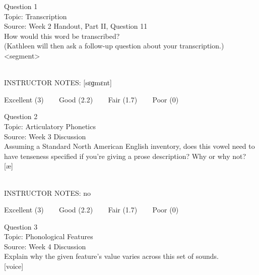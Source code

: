 \documentclass[12pt]{article}
\begin{document}
\begin{center}
\textbf{{\color{blue}{\HUGE START OF EXAM\\}}}

\textbf{{\color{blue}{\HUGE Student ID: 70352\\}}}

\textbf{{\color{blue}{\HUGE \\}}}

\end{center}
\newpage

{\large Question 1}\\

Topic: Transcription\\
Source: Week 2 Handout, Part II, Question 11\\

How would this word be transcribed?\\ (Kathleen will then ask a follow-up question about your transcription.)\\

<segment>


~\\
INSTRUCTOR NOTES: [sɛɡmɛnt]


\vfill
Excellent (3) ~~~ Good (2.2) ~~~ Fair (1.7) ~~~ Poor (0)
\newpage

{\large Question 2}\\

Topic: Articulatory Phonetics\\
Source: Week 3 Discussion\\

Assuming a Standard North American English inventory, does this vowel need to have tenseness specified if you're giving a prose description? Why or why not?\\

{[æ]}


~\\
INSTRUCTOR NOTES: no


\vfill
Excellent (3) ~~~ Good (2.2) ~~~ Fair (1.7) ~~~ Poor (0)
\newpage

{\large Question 3}\\

Topic: Phonological Features\\
Source: Week 4 Discussion\\

Explain why the given feature's value varies across this set of sounds.\\

{[voice]}
\end{document}
